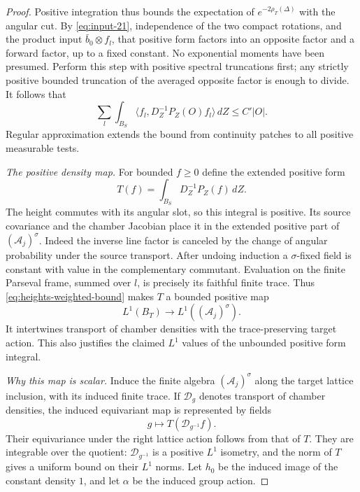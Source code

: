 \begin{proof}
Positive integration thus bounds the expectation of
$e^{-2\rho_T(\Delta)}$ with the angular cut.  By
\eqref{eq:input-21}, independence of the two compact rotations, and the
product input $\bar b_0\otimes f_l$, that positive form factors into an
opposite factor and a forward factor, up to a fixed constant.  No
exponential moments have been presumed.  Perform this step with positive
spectral truncations first; any strictly positive bounded truncation of
the averaged opposite factor is enough to divide.  It follows that
\begin{equation}\label{eq:heights-weighted-bound}
 \sum_l\int_{B_S}
 \langle f_l,D_Z^{-1}P_Z(O)f_l\rangle\,dZ
 \leq C'|O|.
\end{equation}
Regular approximation extends the bound from continuity patches to all
positive measurable tests.

\emph{The positive density map.}
For bounded $f\geq0$ define the extended positive form
\[
 T(f)=\int_{B_S}D_Z^{-1}P_Z(f)\,dZ.
\]
The height commutes with its angular slot, so this integral is positive.
Its source covariance and the chamber Jacobian place it in the extended
positive part of $(\mathcal A_j)^\sigma$.  Indeed the inverse line factor
is canceled by the change of angular probability under the source
transport.  After undoing induction a $\sigma$-fixed field is constant
with value in the complementary commutant.  Evaluation on the finite
Parseval frame, summed over $l$, is precisely its faithful finite trace.
Thus \eqref{eq:heights-weighted-bound} makes $T$ a bounded positive map
\[
 L^1(B_T)\longrightarrow L^1((\mathcal A_j)^\sigma).
\]
It intertwines transport of chamber densities with the trace-preserving
target action.  This also justifies the claimed $L^1$ values of the
unbounded positive form integral.

\emph{Why this map is scalar.}
Induce the finite algebra $(\mathcal A_j)^\sigma$ along the target lattice
inclusion, with its induced finite trace.  If $\mathcal D_g$ denotes
transport of chamber densities, the induced equivariant map is represented
by fields
\[
 g\longmapsto T(\mathcal D_{g^{-1}}f).
\]
Their equivariance under the right lattice action follows from that of
$T$.  They are integrable over the quotient: $\mathcal D_{g^{-1}}$ is a
positive $L^1$ isometry, and the norm of $T$ gives a uniform bound on their
$L^1$ norms.  Let $h_0$ be the induced image of the constant density $1$,
and let $\alpha$ be the induced group action.


\end{proof}
